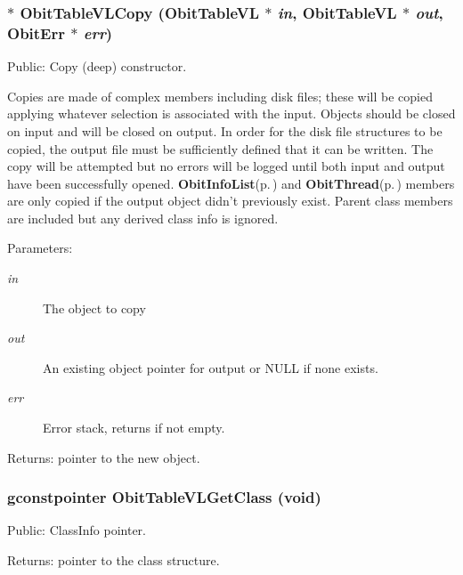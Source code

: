 \subsubsection{$\ast$ Obit\-Table\-VLCopy ({\bf Obit\-Table\-VL} $\ast$ {\em in}, {\bf Obit\-Table\-VL} $\ast$ {\em out}, {\bf Obit\-Err} $\ast$ {\em err})}\label{ObitTableVL_8c_a20}


Public: Copy (deep) constructor. 

Copies are made of complex members including disk files; these will be copied applying whatever selection is associated with the input. Objects should be closed on input and will be closed on output. In order for the disk file structures to be copied, the output file must be sufficiently defined that it can be written. The copy will be attempted but no errors will be logged until both input and output have been successfully opened. {\bf Obit\-Info\-List}{\rm (p.\,\pageref{structObitInfoList})} and {\bf Obit\-Thread}{\rm (p.\,\pageref{structObitThread})} members are only copied if the output object didn't previously exist. Parent class members are included but any derived class info is ignored. \begin{Desc}
\item[Parameters:]
\begin{description}
\item[{\em in}]The object to copy \item[{\em out}]An existing object pointer for output or NULL if none exists. \item[{\em err}]Error stack, returns if not empty. \end{description}
\end{Desc}
\begin{Desc}
\item[Returns:]pointer to the new object. \end{Desc}
\subsubsection{\setlength{\rightskip}{0pt plus 5cm}gconstpointer Obit\-Table\-VLGet\-Class (void)}\label{ObitTableVL_8c_a17}


Public: Class\-Info pointer. 

\begin{Desc}
\item[Returns:]pointer to the class structure. \end{Desc}
